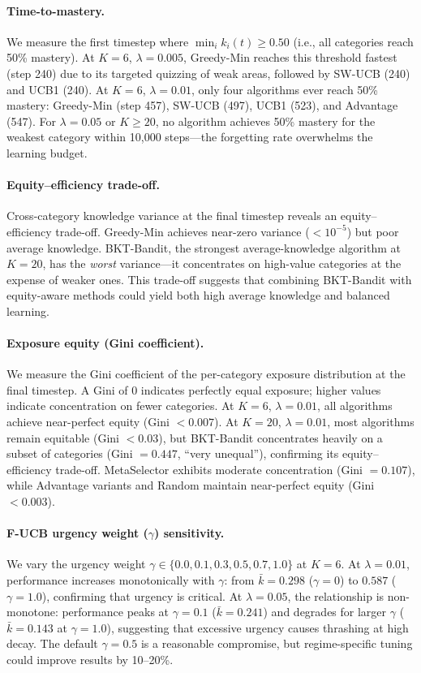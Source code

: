 \paragraph{Time-to-mastery.}
We measure the first timestep where $\min_i k_i(t) \geq 0.50$ (i.e., all categories reach 50\% mastery).
At $K{=}6$, $\lambda{=}0.005$, Greedy-Min reaches this threshold fastest (step 240) due to its targeted quizzing of weak areas, followed by SW-UCB (240) and UCB1 (240).
At $K{=}6$, $\lambda{=}0.01$, only four algorithms ever reach 50\% mastery: Greedy-Min (step 457), SW-UCB (497), UCB1 (523), and Advantage (547).
For $\lambda{=}0.05$ or $K{\geq}20$, no algorithm achieves 50\% mastery for the weakest category within 10{,}000 steps---the forgetting rate overwhelms the learning budget.

\paragraph{Equity--efficiency trade-off.}
Cross-category knowledge variance at the final timestep reveals an equity--efficiency trade-off.
Greedy-Min achieves near-zero variance ($<10^{-5}$) but poor average knowledge.
BKT-Bandit, the strongest average-knowledge algorithm at $K{=}20$, has the \emph{worst} variance---it concentrates on high-value categories at the expense of weaker ones.
This trade-off suggests that combining BKT-Bandit with equity-aware methods could yield both high average knowledge and balanced learning.

\paragraph{Exposure equity (Gini coefficient).}
We measure the Gini coefficient of the per-category exposure distribution at the final timestep.
A Gini of 0 indicates perfectly equal exposure; higher values indicate concentration on fewer categories.
At $K{=}6$, $\lambda{=}0.01$, all algorithms achieve near-perfect equity (Gini $<0.007$).
At $K{=}20$, $\lambda{=}0.01$, most algorithms remain equitable (Gini $<0.03$), but BKT-Bandit concentrates heavily on a subset of categories (Gini $= 0.447$, ``very unequal''), confirming its equity--efficiency trade-off.
MetaSelector exhibits moderate concentration (Gini $= 0.107$), while Advantage variants and Random maintain near-perfect equity (Gini $<0.003$).

\paragraph{F-UCB urgency weight ($\gamma$) sensitivity.}
We vary the urgency weight $\gamma \in \{0.0, 0.1, 0.3, 0.5, 0.7, 1.0\}$ at $K{=}6$.
At $\lambda{=}0.01$, performance increases monotonically with $\gamma$: from $\bar{k}{=}0.298$ ($\gamma{=}0$) to $0.587$ ($\gamma{=}1.0$), confirming that urgency is critical.
At $\lambda{=}0.05$, the relationship is non-monotone: performance peaks at $\gamma{=}0.1$ ($\bar{k}{=}0.241$) and degrades for larger $\gamma$ ($\bar{k}{=}0.143$ at $\gamma{=}1.0$), suggesting that excessive urgency causes thrashing at high decay.
The default $\gamma{=}0.5$ is a reasonable compromise, but regime-specific tuning could improve results by 10--20\%.

